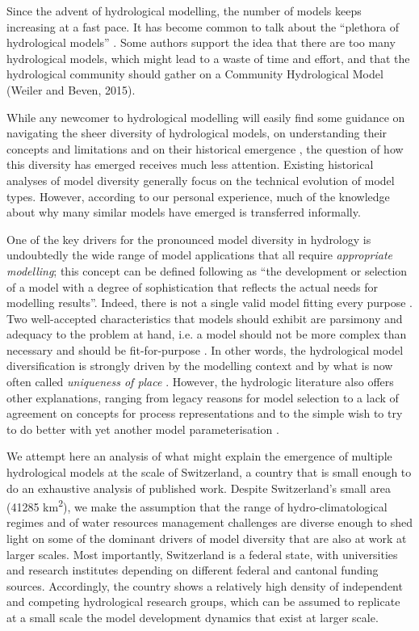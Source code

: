 \documentclass[10pt,a4paper]{article}
\begin{document}
Since the advent of hydrological modelling, the number of models keeps increasing at a fast pace. It has become common to talk about the ``plethora of hydrological models'' \citep{Clark2011a}. Some authors support the idea that there are too many hydrological models, which might lead to a waste of time and effort, and that the hydrological community should gather on a Community Hydrological Model (Weiler and Beven, 2015).

While any newcomer to hydrological modelling will easily find some guidance on navigating the sheer diversity of hydrological models, on understanding their concepts and limitations \citep{Beven2013, Solomatine2011, Kauffeldt2016} and on their historical emergence \citep{Beven2020, Beven2020a}, the question of how this diversity has emerged receives much less attention. Existing historical analyses of model diversity \citep{Peel2020} generally focus on the technical evolution of model types. However, according to our personal experience, much of the knowledge about why many similar models have emerged is transferred informally.

One of the key drivers for the pronounced model diversity in hydrology is undoubtedly the wide range of model applications \citep{Weiler2015} that all require \textit{appropriate modelling}; this concept can be defined following \citet{Rosbjerg2005} as ``the development or selection of a model with a degree of sophistication that reflects the actual needs for modelling results''. Indeed, there is not a single valid model fitting every purpose \citep{Hamalainen2015}. Two well-accepted characteristics that models should exhibit are parsimony and adequacy to the problem at hand, i.e. a model should not be more complex than necessary and should be fit-for-purpose \citep{Beven2013}. In other words, the hydrological model diversification is strongly driven by the modelling context and by what is now often called \textit{uniqueness of place} \citep{Beven2000}. However, the hydrologic literature also offers other explanations, ranging from legacy reasons for model selection \citep{Addor2019} to a lack of agreement on concepts for process representations and to the simple wish to try to do better with yet another model parameterisation \citep{Weiler2015}.

We attempt here an analysis of what might explain the emergence of multiple hydrological models at the scale of Switzerland, a country that is small enough to do an exhaustive analysis of published work. Despite Switzerland's small area (41285 km\textsuperscript{2}), we make the assumption that the range of hydro-climatological regimes \citep{Aschwanden1985} and of water resources management challenges \citep{Schneider2013, FOEN2021} are diverse enough to shed light on some of the dominant drivers of model diversity that are also at work at larger scales. Most importantly, Switzerland is a federal state, with universities and research institutes depending on different federal and cantonal funding sources. Accordingly, the country shows a relatively high density of independent and competing hydrological research groups, which can be assumed to replicate at a small scale the model development dynamics that exist at larger scale.
\end{document}
